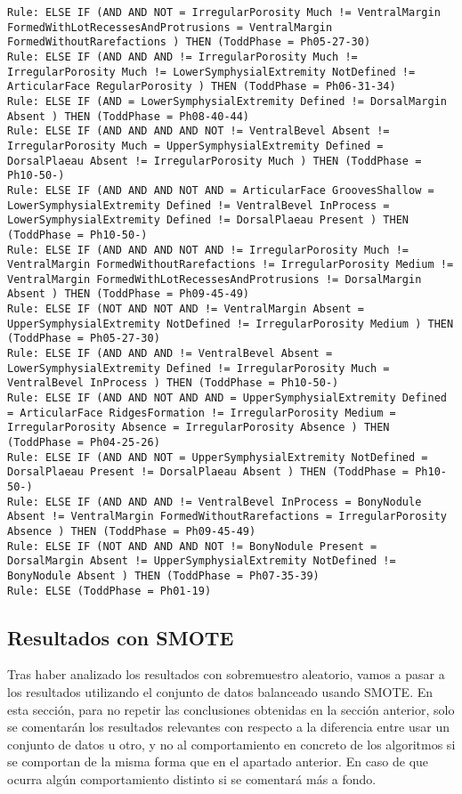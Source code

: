\begin{lstlisting}
Rule: ELSE IF (AND AND NOT = IrregularPorosity Much != VentralMargin FormedWithLotRecessesAndProtrusions = VentralMargin FormedWithoutRarefactions ) THEN (ToddPhase = Ph05-27-30)
Rule: ELSE IF (AND AND AND != IrregularPorosity Much != IrregularPorosity Much != LowerSymphysialExtremity NotDefined != ArticularFace RegularPorosity ) THEN (ToddPhase = Ph06-31-34)
Rule: ELSE IF (AND = LowerSymphysialExtremity Defined != DorsalMargin Absent ) THEN (ToddPhase = Ph08-40-44)
Rule: ELSE IF (AND AND AND AND NOT != VentralBevel Absent != IrregularPorosity Much = UpperSymphysialExtremity Defined = DorsalPlaeau Absent != IrregularPorosity Much ) THEN (ToddPhase = Ph10-50-)
Rule: ELSE IF (AND AND AND NOT AND = ArticularFace GroovesShallow = LowerSymphysialExtremity Defined != VentralBevel InProcess = LowerSymphysialExtremity Defined != DorsalPlaeau Present ) THEN (ToddPhase = Ph10-50-)
Rule: ELSE IF (AND AND AND NOT AND != IrregularPorosity Much != VentralMargin FormedWithoutRarefactions != IrregularPorosity Medium != VentralMargin FormedWithLotRecessesAndProtrusions != DorsalMargin Absent ) THEN (ToddPhase = Ph09-45-49)
Rule: ELSE IF (NOT AND NOT AND != VentralMargin Absent = UpperSymphysialExtremity NotDefined != IrregularPorosity Medium ) THEN (ToddPhase = Ph05-27-30)
Rule: ELSE IF (AND AND AND != VentralBevel Absent = LowerSymphysialExtremity Defined != IrregularPorosity Much = VentralBevel InProcess ) THEN (ToddPhase = Ph10-50-)
Rule: ELSE IF (AND AND NOT AND AND = UpperSymphysialExtremity Defined = ArticularFace RidgesFormation != IrregularPorosity Medium = IrregularPorosity Absence = IrregularPorosity Absence ) THEN (ToddPhase = Ph04-25-26)
Rule: ELSE IF (AND AND NOT = UpperSymphysialExtremity NotDefined = DorsalPlaeau Present != DorsalPlaeau Absent ) THEN (ToddPhase = Ph10-50-)
Rule: ELSE IF (AND AND AND != VentralBevel InProcess = BonyNodule Absent != VentralMargin FormedWithoutRarefactions = IrregularPorosity Absence ) THEN (ToddPhase = Ph09-45-49)
Rule: ELSE IF (NOT AND AND AND NOT != BonyNodule Present = DorsalMargin Absent != UpperSymphysialExtremity NotDefined != BonyNodule Absent ) THEN (ToddPhase = Ph07-35-39)
Rule: ELSE (ToddPhase = Ph01-19)
\end{lstlisting}

\newpage

\subsection{Resultados con SMOTE}

Tras haber analizado los resultados con sobremuestro aleatorio, vamos a pasar a los resultados utilizando el conjunto de datos balanceado usando SMOTE. En esta sección, para no repetir las conclusiones obtenidas en la sección anterior, solo se comentarán los resultados relevantes con respecto a la diferencia entre usar un conjunto de datos u otro, y no al comportamiento en concreto de los algoritmos si se comportan de la misma forma que en el apartado anterior. En caso de que ocurra algún comportamiento distinto si se comentará más a fondo.

